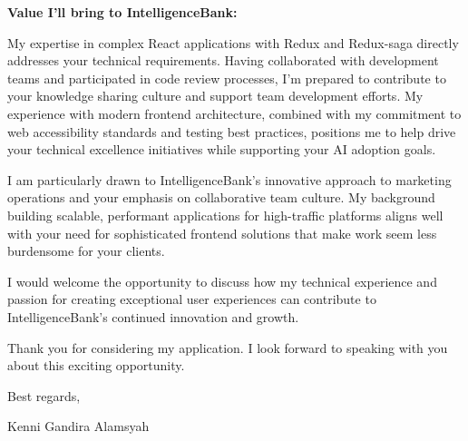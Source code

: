 \documentclass[12pt]{article}
\newcommand{\firstname}{Kenni Gandira}
\newcommand{\lastname}{Alamsyah}
\begin{document}
\vspace{0.5em}

\textbf{Value I'll bring to IntelligenceBank:}

My expertise in complex React applications with Redux and Redux-saga directly addresses your technical requirements. Having collaborated with development teams and participated in code review processes, I'm prepared to contribute to your knowledge sharing culture and support team development efforts. My experience with modern frontend architecture, combined with my commitment to web accessibility standards and testing best practices, positions me to help drive your technical excellence initiatives while supporting your AI adoption goals.

\vspace{0.5em}

I am particularly drawn to IntelligenceBank's innovative approach to marketing operations and your emphasis on collaborative team culture. My background building scalable, performant applications for high-traffic platforms aligns well with your need for sophisticated frontend solutions that make work seem less burdensome for your clients.

\vspace{0.5em}

I would welcome the opportunity to discuss how my technical experience and passion for creating exceptional user experiences can contribute to IntelligenceBank's continued innovation and growth.

\vspace{0.5em}

Thank you for considering my application. I look forward to speaking with you about this exciting opportunity.

\vspace{1em}

Best regards,

\firstname{} \lastname
\end{document}
